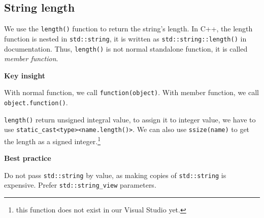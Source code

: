 \documentclass[
  letterpaper,
  DIV=11,
  numbers=noendperiod]{scrreprt}
\begin{document}
\hypertarget{string-length}{%
\subsection{String length}\label{string-length}}

We use the \texttt{length()} function to return the string's length. In
C++, the length function is nested in \texttt{std::string}, it is
written as \texttt{std::string::length()} in documentation. Thus,
\texttt{length()} is not normal standalone function, it is called
\emph{member function}.

\begin{tcolorbox}[enhanced jigsaw, toprule=.15mm, rightrule=.15mm, opacityback=0, breakable, leftrule=.75mm, colback=white, colframe=quarto-callout-note-color-frame, arc=.35mm, left=2mm, bottomrule=.15mm]
\begin{minipage}[t]{5.5mm}
\textcolor{quarto-callout-note-color}{\faInfo}
\end{minipage}%
\begin{minipage}[t]{\textwidth - 5.5mm}

\textbf{Key insight}\vspace{2mm}

With normal function, we call \texttt{function(object)}. With member
function, we call \texttt{object.function()}.

\end{minipage}%
\end{tcolorbox}

\texttt{length()} return unsigned integral value, to assign it to
integer value, we have to use
\texttt{static\_cast\textless{}type\textgreater{}\textless{}name.length()\textgreater{}}.
We can also use \texttt{ssize(name)} to get the length as a signed
integer.\footnote{this function does not exist in our Visual Studio yet.}

\begin{tcolorbox}[enhanced jigsaw, toprule=.15mm, rightrule=.15mm, opacityback=0, breakable, leftrule=.75mm, colback=white, colframe=quarto-callout-tip-color-frame, arc=.35mm, left=2mm, bottomrule=.15mm]
\begin{minipage}[t]{5.5mm}
\textcolor{quarto-callout-tip-color}{\faLightbulb}
\end{minipage}%
\begin{minipage}[t]{\textwidth - 5.5mm}

\textbf{Best practice}\vspace{2mm}

Do not pass \texttt{std::string} by value, as making copies of
\texttt{std::string} is expensive. Prefer \texttt{std::string\_view}
parameters.

\end{minipage}%
\end{tcolorbox}
\end{document}
